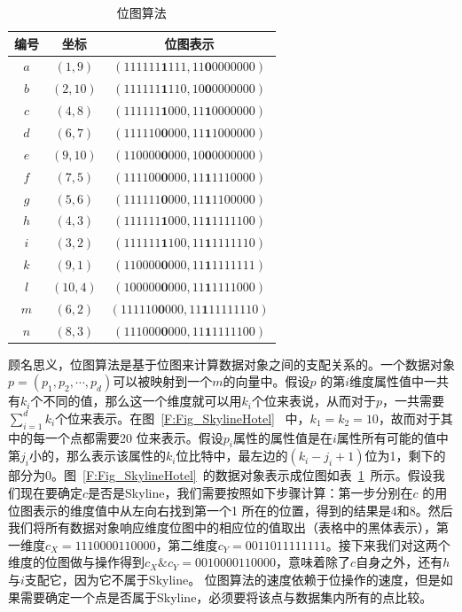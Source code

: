 \begin{enumerate}
    \begin{table}[!thp]
    \centering  %
    \renewcommand{\arraystretch}{1.1} %
    \begin{tabular}{|c|c|c|}
    \hline
    编号 & 坐标 & 位图表示 \\\hline
    $a$ & $(1, 9)$ & $(111111\textbf{1}111, 11\textbf{0}0000000)$ \\\hline
    $b$ & $(2, 10)$ & $(111111\textbf{1}110, 10\textbf{0}0000000)$ \\\hline
    $c$ & $(4, 8)$ & $(111111\textbf{1}000, 11\textbf{1}0000000)$ \\\hline
    $d$ & $(6, 7)$ & $(111110\textbf{0}000, 11\textbf{1}1000000)$ \\\hline
    $e$ & $(9, 10)$ & $(110000\textbf{0}000, 10\textbf{0}0000000)$ \\\hline
    $f$ & $(7, 5)$ & $(111100\textbf{0}000, 11\textbf{1}1110000)$ \\\hline
    $g$ & $(5, 6)$ & $(111111\textbf{0}000, 11\textbf{1}1100000)$ \\\hline
    $h$ & $(4, 3)$ & $(111111\textbf{1}000, 11\textbf{1}1111100)$ \\\hline
    $i$ & $(3, 2)$ & $(111111\textbf{1}100, 11\textbf{1}1111110)$ \\\hline
    $k$ & $(9, 1)$ & $(110000\textbf{0}000, 11\textbf{1}1111111)$ \\\hline
    $l$ & $(10, 4)$ & $(100000\textbf{0}000, 11\textbf{1}1111000)$ \\\hline
    $m$ & $(6, 2)$ & $(111110\textbf{0}000, 11\textbf{1}11111110)$ \\\hline
    $n$ & $(8, 3)$ & $(111000\textbf{0}000, 11\textbf{1}1111100)$ \\\hline
    \end{tabular}
    \caption{位图算法}\label{T:Tab_Bitmap}
    \end{table}

  顾名思义，位图算法是基于位图来计算数据对象之间的支配关系的。一个数据对象$p=(p_{1}, p_{2}, \cdots, p_{d})$可以被映射到一个$m$的向量中。假设$p$ 的第$i$维度属性值中一共有$k_{i}$个不同的值，那么这一个维度就可以用$k_{i}$个位来表说，从而对于$p$，一共需要$\sum_{i=1}^{d}k_{i}$个位来表示。在图~\ref{F:Fig_SkylineHotel}~ 中，$k_{1}=k_{2}=10$，故而对于其中的每一个点都需要20 位来表示。假设$p_{i}$属性的属性值是在$i$属性所有可能的值中第$j_{i}$小的，那么表示该属性的$k_{i}$位比特中，最左边的$(k_{i}-j_{i}+1)$位为1，剩下的部分为0。图~\ref{F:Fig_SkylineHotel}~的数据对象表示成位图如表~\ref{T:Tab_Bitmap}~所示。假设我们现在要确定$c$是否是Skyline，我们需要按照如下步骤计算：第一步分别在$c$ 的用位图表示的维度值中从左向右找到第一个1 所在的位置，得到的结果是4和8。然后我们将所有数据对象响应维度位图中的相应位的值取出（表格中的黑体表示），第一维度$c_{X}=1110000110000$，第二维度$c_{Y}=0011011111111$。接下来我们对这两个维度的位图做与操作得到$c_{X} \& c_{Y}=0010000110000$，意味着除了$c$自身之外，还有$h$与$i$支配它，因为它不属于Skyline。 位图算法的速度依赖于位操作的速度，但是如果需要确定一个点是否属于Skyline，必须要将该点与数据集内所有的点比较。


\end{enumerate}
